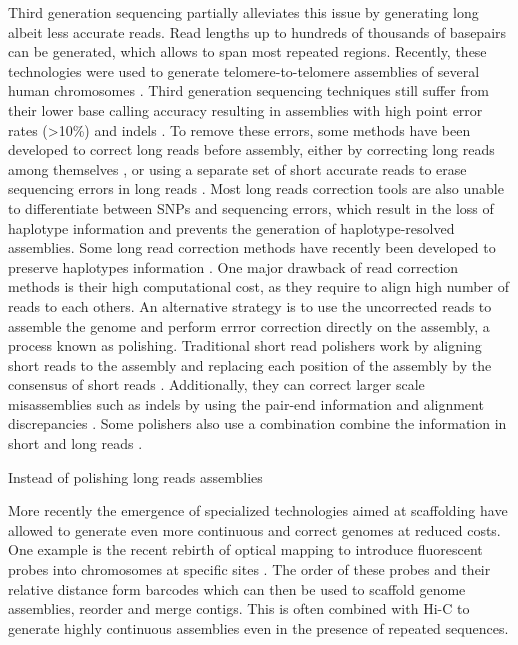 Third generation sequencing partially alleviates this issue by generating long albeit less accurate reads. Read lengths up to hundreds of thousands of basepairs can be generated, which allows to span most repeated regions. Recently, these technologies were used to generate telomere-to-telomere assemblies of several human chromosomes \cite{migaTelomeretotelomereAssemblyComplete2020}. Third generation sequencing techniques still suffer from their lower base calling accuracy resulting in assemblies with high point error rates (>10\%) and indels \cite{weiratherComprehensiveComparisonPacific2017,jainNanoporeSequencingAssembly2018}. To remove these errors, some methods have been developed to correct long reads before assembly, either by correcting long reads among themselves \cite{morisseScalableLongRead2021}, or using a separate set of short accurate reads to erase sequencing errors in long reads \cite{wangFMLRCHybridLong2018}. Most long reads correction tools are also unable to differentiate between SNPs and sequencing errors, which result in the loss of haplotype information and prevents the generation of haplotype-resolved assemblies. Some long read correction methods have recently been developed to preserve haplotypes information \cite{holleyRatatoskHybridError2021}. One major drawback of read correction methods is their high computational cost, as they require to align high number of reads to each others. An alternative strategy is to use the uncorrected reads to assemble the genome and perform errror correction directly on the assembly, a process known as \Gls{polishing}. Traditional short read polishers work by aligning short reads to the assembly and replacing each position of the assembly by the consensus of short reads \cite{vaserFastAccurateNovo2017}. Additionally, they can correct larger scale misassemblies such as indels by using the pair-end information and alignment discrepancies \cite{walkerPilonIntegratedTool2014}. Some polishers also use a combination combine the information in short and long reads \cite{kunduHyPoSuperFast2019}.

Instead of polishing long reads assemblies

More recently the emergence of specialized technologies aimed at scaffolding have allowed to generate even more continuous and correct genomes at reduced costs. One example is the recent rebirth of optical mapping to introduce fluorescent probes into chromosomes at specific sites \cite{lamGenomeMappingNanochannel2012}. The order of these probes and their relative distance form barcodes which can then be used to scaffold genome assemblies, reorder and merge contigs. This is often combined with Hi-C to generate highly continuous assemblies even in the presence of repeated sequences.

